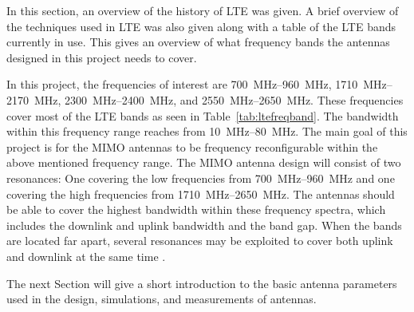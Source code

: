 \begin{aautail}
    In this section, an overview of the history of LTE was given. A brief overview of the techniques used in LTE was also given along with a table of the LTE bands currently in use. This gives an overview of what frequency bands the antennas designed in this project needs to cover.

    In this project, the frequencies of interest are \SIrange{700}{960}{MHz}, \SIrange{1710}{2170}{MHz}, \SIrange{2300}{2400}{MHz}, and \SIrange{2550}{2650}{MHz}. These frequencies cover most of the LTE bands as seen in Table~\ref{tab:ltefreqband}. The bandwidth within this frequency range reaches from \SIrange{10}{80}{MHz}. The main goal of this project is for the MIMO antennas to be frequency reconfigurable within the above mentioned frequency range. The MIMO antenna design will consist of two resonances: One covering the low frequencies from \SIrange{700}{960}{MHz} and one covering the high frequencies from \SIrange{1710}{2650}{MHz}. The antennas should be able to cover the highest bandwidth within these frequency spectra, which includes the downlink and uplink bandwidth and the band gap. When the bands are located far apart, several resonances may be exploited to cover both uplink and downlink at the same time \cite{radio2015electronics}. 
    
    The next Section will give a short introduction to the basic antenna parameters used in the design, simulations, and measurements of antennas.
\end{aautail}
